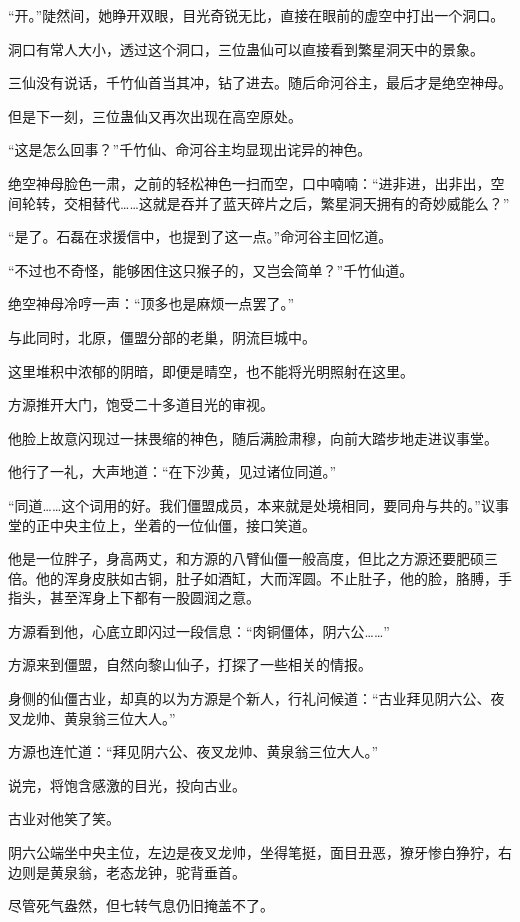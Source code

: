 \begin{this_body}
“开。”陡然间，她睁开双眼，目光奇锐无比，直接在眼前的虚空中打出一个洞口。

洞口有常人大小，透过这个洞口，三位蛊仙可以直接看到繁星洞天中的景象。

三仙没有说话，千竹仙首当其冲，钻了进去。随后命河谷主，最后才是绝空神母。

但是下一刻，三位蛊仙又再次出现在高空原处。

“这是怎么回事？”千竹仙、命河谷主均显现出诧异的神色。

绝空神母脸色一肃，之前的轻松神色一扫而空，口中喃喃：“进非进，出非出，空间轮转，交相替代……这就是吞并了蓝天碎片之后，繁星洞天拥有的奇妙威能么？”

“是了。石磊在求援信中，也提到了这一点。”命河谷主回忆道。

“不过也不奇怪，能够困住这只猴子的，又岂会简单？”千竹仙道。

绝空神母冷哼一声：“顶多也是麻烦一点罢了。”

与此同时，北原，僵盟分部的老巢，阴流巨城中。

这里堆积中浓郁的阴暗，即便是晴空，也不能将光明照射在这里。

方源推开大门，饱受二十多道目光的审视。

他脸上故意闪现过一抹畏缩的神色，随后满脸肃穆，向前大踏步地走进议事堂。

他行了一礼，大声地道：“在下沙黄，见过诸位同道。”

“同道……这个词用的好。我们僵盟成员，本来就是处境相同，要同舟与共的。”议事堂的正中央主位上，坐着的一位仙僵，接口笑道。

他是一位胖子，身高两丈，和方源的八臂仙僵一般高度，但比之方源还要肥硕三倍。他的浑身皮肤如古铜，肚子如酒缸，大而浑圆。不止肚子，他的脸，胳膊，手指头，甚至浑身上下都有一股圆润之意。

方源看到他，心底立即闪过一段信息：“肉铜僵体，阴六公……”

方源来到僵盟，自然向黎山仙子，打探了一些相关的情报。

身侧的仙僵古业，却真的以为方源是个新人，行礼问候道：“古业拜见阴六公、夜叉龙帅、黄泉翁三位大人。”

方源也连忙道：“拜见阴六公、夜叉龙帅、黄泉翁三位大人。”

说完，将饱含感激的目光，投向古业。

古业对他笑了笑。

阴六公端坐中央主位，左边是夜叉龙帅，坐得笔挺，面目丑恶，獠牙惨白狰狞，右边则是黄泉翁，老态龙钟，驼背垂首。

尽管死气盎然，但七转气息仍旧掩盖不了。


\end{this_body}
